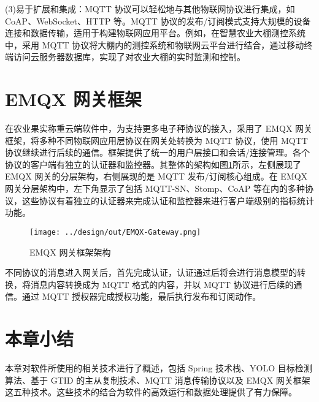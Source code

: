 
(3)易于扩展和集成：MQTT 协议可以轻松地与其他物联网协议进行集成，如 CoAP、WebSocket、HTTP 等。MQTT 协议的发布/订阅模式支持大规模的设备连接和数据传输，适用于构建物联网应用平台。例如，在智慧农业大棚测控系统中，采用 MQTT 协议将大棚内的测控系统和物联网云平台进行结合，通过移动终端访问云服务器数据库，实现了对农业大棚的实时监测和控制\cite{Liang2020}。

\section{EMQX 网关框架}\label{sec:emqx}

在农业果实称重云端软件中，为支持更多电子秤协议的接入，采用了 EMQX 网关框架，将多种不同物联网应用层协议在网关处转换为 MQTT 协议，使用 MQTT 协议继续进行后续的通信。框架提供了统一的用户层接口和会话/连接管理。各个协议的客户端有独立的认证器和监控器\cite{EMQX-Gateway}。其整体的架构如图\ref{fig:EMQX-Gateway}所示，左侧展现了 EMQX 网关的分层架构，右侧展现的是 MQTT 发布/订阅核心组成。在 EMQX 网关分层架构中，左下角显示了包括 MQTT-SN、Stomp、CoAP 等在内的多种协议，这些协议有着独立的认证器来完成认证和监控器来进行客户端级别的指标统计功能。

\begin{figure}[H]
    \centering
    \texttt{[image: ../design/out/EMQX-Gateway.png]}
    \caption{EMQX 网关框架架构}
    \label{fig:EMQX-Gateway}
\end{figure}

不同协议的消息进入网关后，首先完成认证，认证通过后将会进行消息模型的转换，将消息内容转换成为 MQTT 格式的内容，并以 MQTT 协议进行后续的通信。通过 MQTT 授权器完成授权功能，最后执行发布和订阅动作。

\section{本章小结}

本章对软件所使用的相关技术进行了概述，包括 Spring 技术栈、YOLO 目标检测算法、基于 GTID 的主从复制技术、MQTT 消息传输协议以及 EMQX 网关框架这五种技术。这些技术的结合为软件的高效运行和数据处理提供了有力保障。
